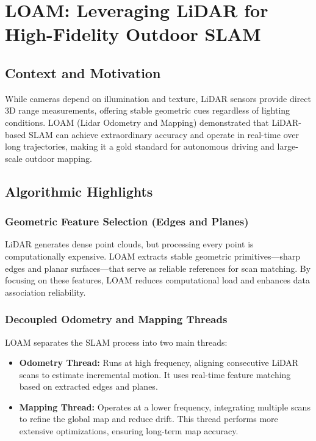 \documentclass[conference]{IEEEtran}
\begin{document}
\section{LOAM: Leveraging LiDAR for High-Fidelity Outdoor SLAM}
\subsection{Context and Motivation}
While cameras depend on illumination and texture, LiDAR sensors provide direct 3D range measurements, offering stable geometric cues regardless of lighting conditions. LOAM (Lidar Odometry and Mapping) \cite{2} demonstrated that LiDAR-based SLAM can achieve extraordinary accuracy and operate in real-time over long trajectories, making it a gold standard for autonomous driving and large-scale outdoor mapping.

\subsection{Algorithmic Highlights}
\subsubsection{Geometric Feature Selection (Edges and Planes)}
LiDAR generates dense point clouds, but processing every point is computationally expensive. LOAM extracts stable geometric primitives—sharp edges and planar surfaces—that serve as reliable references for scan matching. By focusing on these features, LOAM reduces computational load and enhances data association reliability.

\subsubsection{Decoupled Odometry and Mapping Threads}
LOAM separates the SLAM process into two main threads:

\begin{itemize}
    \item \textbf{Odometry Thread:} Runs at high frequency, aligning consecutive LiDAR scans to estimate incremental motion. It uses real-time feature matching based on extracted edges and planes.
    \item \textbf{Mapping Thread:} Operates at a lower frequency, integrating multiple scans to refine the global map and reduce drift. This thread performs more extensive optimizations, ensuring long-term map accuracy.
\end{itemize}
\end{document}
